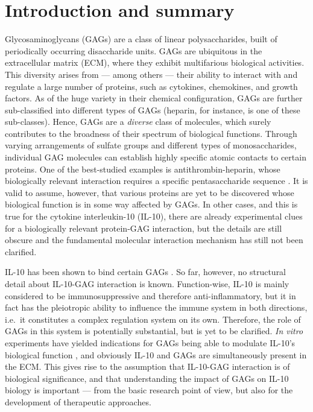 
\vspace{-0.5cm}

\chapter{Introduction and summary}



Glycosaminoglycans (GAGs) are a class of linear polysaccharides, built of
periodically occurring disaccharide units. GAGs are ubiquitous in the
extracellular matrix (ECM), where they exhibit multifarious biological
activities. This diversity arises from --- among others --- their ability to
interact with and regulate a large number of proteins, such as cytokines,
chemokines, and growth factors. As of the huge variety in their chemical
configuration, GAGs are further sub-classified into different types of GAGs
(heparin, for instance, is one of these sub-classes). Hence, GAGs are a
\textit{diverse} class of molecules, which surely contributes to the broadness
of their spectrum of biological functions. Through varying arrangements of
sulfate groups and different types of monosaccharides, individual GAG molecules
can establish highly specific atomic contacts to certain proteins. One of the
best-studied examples is antithrombin-heparin, whose biologically relevant
interaction requires a specific pentasaccharide sequence
\cite{antithrombin-thrombin-heparin-2004}. It is valid to assume, however, that
various proteins are yet to be discovered whose biological function is in some
way affected by GAGs. In other cases, and this is true for the cytokine
interleukin-10 (IL-10), there are already experimental clues for a biologically
relevant protein-GAG interaction, but the details are still obscure and the
fundamental molecular interaction mechanism has still not been clarified.

IL-10 has been shown to bind certain GAGs \cite{salek_ardakani_2000}. So far,
however, no structural detail about IL-10-GAG interaction is known.
Function-wise, IL-10 is mainly considered to be immunosuppressive and therefore
anti-inflammatory, but it in fact has the pleiotropic ability to influence the
immune system in both directions, i.e.\ it constitutes a complex regulation
system on its own. Therefore, the role of GAGs in this system is potentially
substantial, but is yet to be clarified. \textit{In vitro} experiments have
yielded indications for GAGs being able to modulate IL-10's biological function
\cite{salek_ardakani_2000}, and obviously IL-10 and GAGs are simultaneously
present in the ECM. This gives rise to the assumption that IL-10-GAG interaction
is of biological significance, and that understanding the impact of GAGs on
IL-10 biology is important --- from the basic research point of view, but also
for the development of therapeutic approaches.

